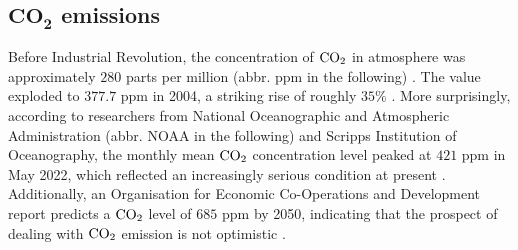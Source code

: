 \documentclass[12pt,a4paper]{article}
\begin{document}
    \subsection{$\mathbf{CO_2}$ emissions}
    
    Before Industrial Revolution, the concentration of $\ce{CO2}$ in atmosphere was approximately $280$ parts per million (abbr. ppm in the following) \autocite{neftel_evidence_1985}. The value exploded to $377.7$ ppm in 2004, a striking rise of roughly $35\%$ \autocite{dr_pieter_tans_trends_2022}. More surprisingly, according to researchers from National Oceanographic and Atmospheric Administration (abbr. NOAA in the following) and Scripps Institution of Oceanography, the monthly mean $\ce{CO2}$ concentration level peaked at $421$ ppm in May 2022, which reflected an increasingly serious condition at present \autocite{national_oceanographic_and_atmospheric_administration_carbon_2022}. Additionally, an Organisation for Economic Co-Operations and Development report predicts a $\ce{CO2}$ level of $685$ ppm by 2050, indicating that the prospect of dealing with $\ce{CO2}$ emission is not optimistic \autocite{organisation_for_economic_co-operations_and_development_oecd_2012}.
\end{document}
